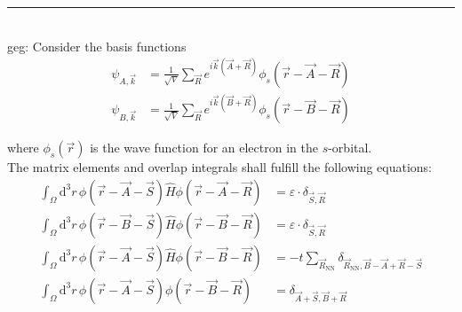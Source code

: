 \documentclass{article}
\newcommand{\diff}{\mathrm{d}}
\begin{document}
{\color{blue}
\hrule
	\\
	geg: Consider the basis functions
		\begin{align*}
			\psi_{A,\vec{k}} &= \frac{1}{\sqrt{V}} \sum_{\vec{R}} e^{i\vec{k}(\vec{A} + \vec{R})} \phi_s(\vec{r} - \vec{A} - \vec{R}) \\
			\psi_{B,\vec{k}} &= \frac{1}{\sqrt{V}} \sum_{\vec{R}} e^{i\vec{k}(\vec{B} + \vec{R})} \phi_s(\vec{r} - \vec{B} - \vec{R})
		\end{align*}
	
	where $\phi_s(\vec{r})$ is the wave function for an electron in the $s$-orbital.\\
	The matrix elements and overlap integrals shall fulfill the following equations:
		\begin{align*}
			\int_\Omega \diff^3r \, \phi(\vec{r} - \vec{A} - \vec{S}) \hat{H} \phi(\vec{r} - \vec{A} - \vec{R}) &= \varepsilon \cdot \delta_{\vec{S},\vec{R}} \\
			\int_\Omega \diff^3r \, \phi(\vec{r} - \vec{B} - \vec{S}) \hat{H} \phi(\vec{r} - \vec{B} - \vec{R}) &= \varepsilon \cdot \delta_{\vec{S},\vec{R}} \\
			\int_\Omega \diff^3r \, \phi(\vec{r} - \vec{A} - \vec{S}) \hat{H} \phi(\vec{r} - \vec{B} - \vec{R}) &= -t \sum_{\vec{R}_\text{NN}} \delta_{\vec{R}_\text{NN},\vec{B}-\vec{A}+\vec{R}-\vec{S}} \\
			\int_\Omega \diff^3r \, \phi(\vec{r} - \vec{A} - \vec{S}) \phi(\vec{r} - \vec{B} - \vec{R}) &= \delta_{\vec{A}+\vec{S},\vec{B}+\vec{R}}
		\end{align*}

}
\end{document}
